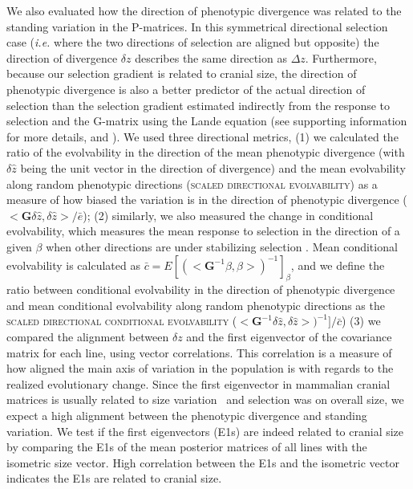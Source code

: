 \begin{refsection}
We also evaluated how the direction of phenotypic divergence was related
to the standing variation in the P-matrices. In this symmetrical
directional selection case (\emph{i.e.} where the two directions of
selection are aligned but opposite) the direction of divergence
\(\delta z\) describes the same direction as \(\Delta z\). Furthermore,
because our selection gradient is related to cranial size, the direction
of phenotypic divergence is also a better predictor of the actual
direction of selection than the selection gradient estimated indirectly
from the response to selection and the G-matrix using the Lande equation
(see supporting information for more details, and \textcite{Marroig2012-jd}). We used
three directional metrics, (1) we calculated the ratio of the
evolvability in the direction of the mean phenotypic divergence (with
\(\delta \hat z\) being the unit vector in the direction of divergence)
and the mean evolvability along random phenotypic directions
(\textsc{scaled directional evolvability}) as a measure of how biased
the variation is in the direction of phenotypic divergence
(\(<\mathbf{G}\delta \hat z ,\delta \hat z > / \bar{e}\)); (2)
similarly, we also measured the change in conditional evolvability,
which measures the mean response to selection in the direction of a
given \(\beta\) when other directions are under stabilizing selection
\parencite{Hansen2008-kz}. Mean conditional evolvability is calculated as
\(\bar{c} = E[(<\mathbf{G}^{-1}\beta, \beta>)^{-1}]_\beta\), and we
define the ratio between conditional evolvability in the direction of
phenotypic divergence and mean conditional evolvability along random
phenotypic directions as the \textsc{scaled directional conditional
evolvability}
(\(<\mathbf{G}^{-1}\delta \hat z, \delta \hat z>)^{-1}] / \bar{c}\)) (3)
we compared the alignment between \(\delta z\) and the first eigenvector
of the covariance matrix for each line, using vector correlations. This
correlation is a measure of how aligned the main axis of variation in
the population is with regards to the realized evolutionary change.
Since the first eigenvector in mammalian cranial matrices is usually
related to size variation~\parencite{Porto2009-pi} and selection was on overall
size, we expect a high alignment between the phenotypic divergence and
standing variation. We test if the first eigenvectors (E1s) are indeed
related to cranial size by comparing the E1s of the mean posterior
matrices of all lines with the isometric size vector. High correlation
between the E1s and the isometric vector indicates the E1s are related
to cranial size.


\end{refsection}
